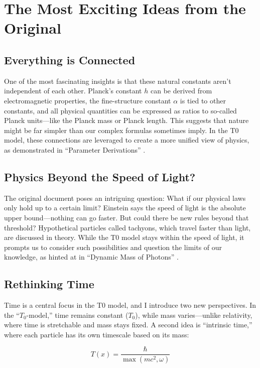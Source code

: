 \documentclass[a4paper,12pt]{article}
\newcommand{\Tfield}{T(x)}
\begin{document}
	\section{The Most Exciting Ideas from the Original}
	
	\subsection{Everything is Connected}
	
	One of the most fascinating insights is that these natural constants aren’t independent of each other. Planck’s constant \(h\) can be derived from electromagnetic properties, the fine-structure constant \(\alpha\) is tied to other constants, and all physical quantities can be expressed as ratios to so-called Planck units—like the Planck mass or Planck length. This suggests that nature might be far simpler than our complex formulas sometimes imply. In the T0 model, these connections are leveraged to create a more unified view of physics, as demonstrated in “Parameter Derivations” \cite{pascher_params_2025}.
	
	\subsection{Physics Beyond the Speed of Light?}
	
	The original document poses an intriguing question: What if our physical laws only hold up to a certain limit? Einstein says the speed of light is the absolute upper bound—nothing can go faster. But could there be new rules beyond that threshold? Hypothetical particles called tachyons, which travel faster than light, are discussed in theory. While the T0 model stays within the speed of light, it prompts us to consider such possibilities and question the limits of our knowledge, as hinted at in “Dynamic Mass of Photons” \cite{pascher_photons_2025}.
	
	\subsection{Rethinking Time}
	
	Time is a central focus in the T0 model, and I introduce two new perspectives. In the “\(T_0\)-model,” time remains constant (\(T_0\)), while mass varies—unlike relativity, where time is stretchable and mass stays fixed. A second idea is “intrinsic time,” where each particle has its own timescale based on its mass:
	
	\begin{equation}
		\Tfield = \frac{\hbar}{\max(m c^2, \omega)}
	\end{equation}
	
\end{document}
